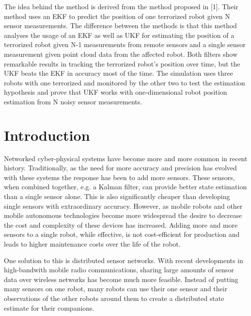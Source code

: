 \documentclass[conference]{IEEEtran} \usepackage[T1]{fontenc} \usepackage[backend=biber, style=ieee]{biblatex}
\begin{document}
The idea behind the method is derived from the method proposed in [1]. Their method uses an EKF to predict the position
of one terrorized robot given N sensor measurements. The difference between the methods is that this method analyses the
usage of an EKF as well as UKF for estimating the position of a terrorized robot given N-1 measurements from remote
sensors and a single sensor measurement given point cloud data from the affected robot. Both filters show remarkable
results in tracking the terrorized robot's position over time, but the UKF beats the EKF in accuracy most of the time.
The simulation uses three robots with one terrorized and monitored by the other two to test the estimation hypothesis
and prove that UKF works with one-dimensional robot position estimation from N noisy sensor measurements.

\section{Introduction} \label{Introduction}
Networked cyber-physical systems have become more and more common in recent history. Traditionally, as the need for more
accuracy and precision has evolved with these systems the response has been to add more sensors. These sensors, when
combined together, e.g. a Kalman filter, can provide better state estimation than a single sensor alone. This is also
significantly cheaper than developing single sensors with extraordinary accuracy. However, as mobile robots and other
mobile autonomous technologies become more widespread the desire to decrease the cost and complexity of these devices
has increased. Adding more and more sensors to a single robot, while effective, is not cost-efficient for production and
leads to higher maintenance costs over the life of the robot.

One solution to this is distributed sensor networks. With recent developments in high-bandwith mobile radio
communications, sharing large amounts of sensor data over wireless networks has become much more feasible. Instead of
putting many sensors on one robot, many robots can use their one sensor and their observations of the other robots
around them to create a distributed state estimate for their companions.
\end{document}
